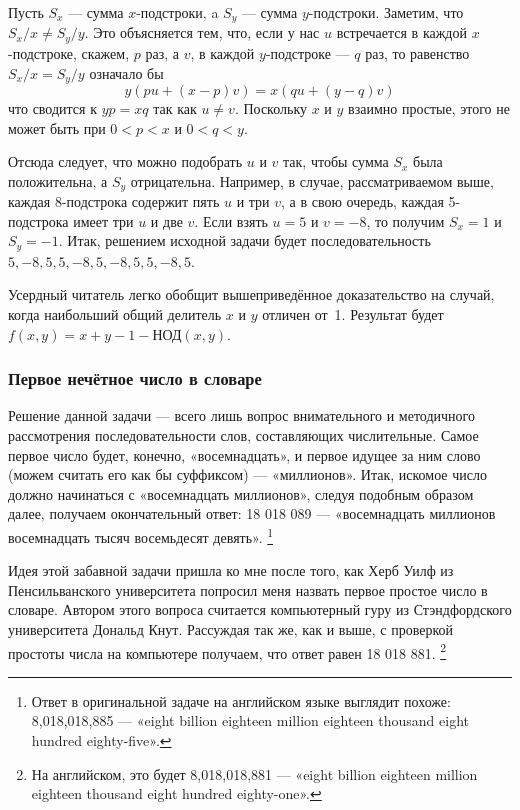 Пусть $S_x$ --- сумма $x$-подстроки, a $S_y$ --- сумма $y$-подстроки.
Заметим, что $S_x/x\ne S_y/y$.
Это объясняется тем, что, если у нас $u$ встречается в каждой
 $x$-подстроке, скажем, $p$ раз, а $v$, в каждой $y$-подстроке --- $q$ раз, 
 то равенство $S_x/x=S_y/y$
 означало бы 
\[y(pu+(x-p)v)=x(qu+(y-q)v)\]
что сводится к $yp=xq$ так как $u\ne v$.
Поскольку $x$ и $y$ взаимно простые, этого не может быть при $0<p<x$ и $0<q<y$.

Отсюда следует, что можно подобрать $u$ и $v$ так, чтобы сумма $S_x$ была положительна, а $S_y$ отрицательна.
Например, в случае, рассматриваемом выше, каждая 8-подстрока содержит пять $u$ и три $v$, 
а в свою очередь, каждая 5-подстрока имеет три $u$ и две $v$.
Если взять $u=5$ и $v=-8$, то получим $S_x=1$ и $S_y=-1$.
Итак, решением исходной задачи будет последовательность $5,-8,5,5,-8,5,-8,5,5,-8,5$.
\heart

Усердный читатель легко обобщит вышеприведённое доказательство на случай, 
когда наибольший общий делитель $x$ и $y$ отличен от~1.
Результат будет $f(x,y)=x+y-1-\text{НОД}(x,y)$.

\subsubsection*{Первое нечётное число в словаре}%

Решение данной задачи --- всего лишь вопрос внимательного и методичного рассмотрения последовательности слов, составляющих числительные.
Самое первое число будет, конечно, «восемнадцать», и первое идущее за ним слово (можем считать его как бы суффиксом) --- «миллионов».
Итак, искомое число должно начинаться с «восемнадцать миллионов», следуя подобным образом далее, получаем окончательный ответ: 18 018 089 --- «восемнадцать миллионов восемнадцать тысяч восемьдесят девять».%
\footnote{Ответ в оригинальной задаче на английском языке выглядит похоже: 8,018,018,885 --- «eight billion eighteen million eighteen thousand eight hundred eighty-five».}
\heart

Идея этой забавной задачи пришла ко мне после того, как Херб Уилф из Пенсильванского университета %
попросил меня назвать первое простое число в словаре.
Автором этого вопроса считается компьютерный гуру из Стэндфордского университета Дональд Кнут. %
Рассуждая так же, как и выше, с проверкой простоты числа на компьютере
получаем, что ответ равен 18 018 881.%
\footnote{На английском, это будет 8,018,018,881 --- «eight billion eighteen million eighteen thousand eight hundred eighty-one».
}

